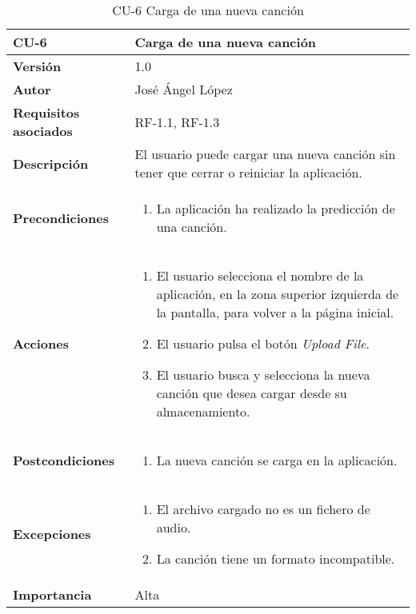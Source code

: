 \begin{table}[p]
	\centering
	\begin{tabularx}{\linewidth}{ p{} p{} }
		\toprule
		\textbf{CU-6}    & \textbf{Carga de una nueva canción}\\
		\toprule
		\textbf{Versión}              & 1.0    \\
		\textbf{Autor}                & José Ángel López \\
		\textbf{Requisitos asociados} & RF-1.1, RF-1.3 \\
		\textbf{Descripción}          & El usuario puede cargar una nueva canción sin tener que cerrar o reiniciar la aplicación. \\
		\textbf{Precondiciones}        & 
		\begin{enumerate}		    
			\def\labelenumi{\arabic{enumi}.}
			\tightlist
			\item La aplicación ha realizado la predicción de una canción.
		\end{enumerate}\\
		\textbf{Acciones}             &
		\begin{enumerate}
			\def\labelenumi{\arabic{enumi}.}
			\tightlist
			\item El usuario selecciona el nombre de la aplicación, en la zona superior izquierda de la pantalla, para volver a la página inicial.
			\item El usuario pulsa el botón \textit{Upload File}.
			\item El usuario busca y selecciona la nueva canción que desea cargar desde su almacenamiento.
		\end{enumerate}\\
		\textbf{Postcondiciones} &
		\begin{enumerate}
			\def\labelenumi{\arabic{enumi}.}
			\tightlist
			\item La nueva canción se carga en la aplicación.
		\end{enumerate}\\
		\textbf{Excepciones} &
		\begin{enumerate}
			\def\labelenumi{\arabic{enumi}.}
			\tightlist
			\item El archivo cargado no es un fichero de audio.
			\item La canción tiene un formato incompatible.
		\end{enumerate}\\
		\textbf{Importancia}          & Alta \\
		\bottomrule
	\end{tabularx}
	\caption{CU-6 Carga de una nueva canción}
\end{table}